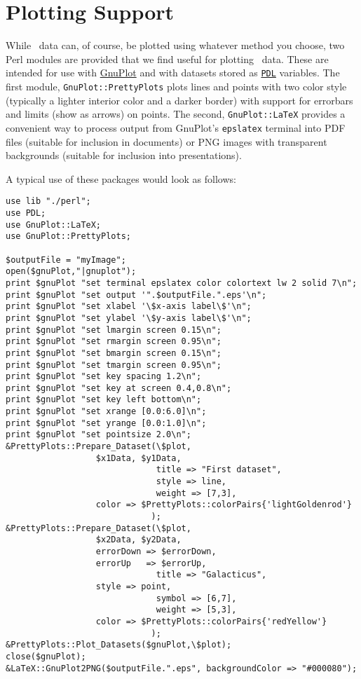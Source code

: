 \chapter{Plotting Support}

While \glc\ data can, of course, be plotted using whatever method you choose, two Perl modules are provided that we find useful for plotting \glc\ data. These are intended for use with \href{http://www.gnuplot.info/}{\sc GnuPlot} and with datasets stored as \href{http://pdl.perl.org/}{\tt PDL} variables. The first module, {\tt GnuPlot::PrettyPlots} plots lines and points with two color style (typically a lighter interior color and a darker border) with support for errorbars and limits (show as arrows) on points. The second, {\tt GnuPlot::LaTeX} provides a convenient way to process output from {\sc GnuPlot}'s {\tt epslatex} terminal into PDF files (suitable for inclusion in documents) or PNG images with transparent backgrounds (suitable for inclusion into presentations).

A typical use of these packages would look as follows:
\begin{verbatim}
use lib "./perl";
use PDL;
use GnuPlot::LaTeX;
use GnuPlot::PrettyPlots;

$outputFile = "myImage";
open($gnuPlot,"|gnuplot");
print $gnuPlot "set terminal epslatex color colortext lw 2 solid 7\n";
print $gnuPlot "set output '".$outputFile.".eps'\n";
print $gnuPlot "set xlabel '\$x-axis label\$'\n";
print $gnuPlot "set ylabel '\$y-axis label\$'\n";
print $gnuPlot "set lmargin screen 0.15\n";
print $gnuPlot "set rmargin screen 0.95\n";
print $gnuPlot "set bmargin screen 0.15\n";
print $gnuPlot "set tmargin screen 0.95\n";
print $gnuPlot "set key spacing 1.2\n";
print $gnuPlot "set key at screen 0.4,0.8\n";
print $gnuPlot "set key left bottom\n";
print $gnuPlot "set xrange [0.0:6.0]\n";
print $gnuPlot "set yrange [0.0:1.0]\n";
print $gnuPlot "set pointsize 2.0\n";
&PrettyPlots::Prepare_Dataset(\$plot,
			      $x1Data, $y1Data,
                              title => "First dataset",
                              style => line,
                              weight => [7,3],
			      color => $PrettyPlots::colorPairs{'lightGoldenrod'}
                             );
&PrettyPlots::Prepare_Dataset(\$plot,
			      $x2Data, $y2Data,
			      errorDown => $errorDown,
			      errorUp   => $errorUp,
                              title => "Galacticus",
			      style => point,
                              symbol => [6,7],
                              weight => [5,3],
			      color => $PrettyPlots::colorPairs{'redYellow'}
                             );
&PrettyPlots::Plot_Datasets($gnuPlot,\$plot);
close($gnuPlot);
&LaTeX::GnuPlot2PNG($outputFile.".eps", backgroundColor => "#000080");
\end{verbatim}

